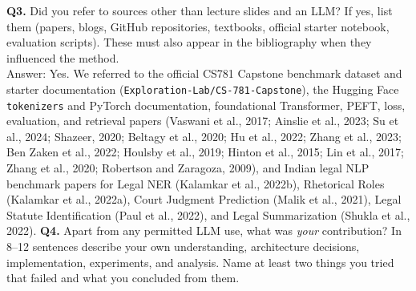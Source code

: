 \documentclass[11pt, oneside]{article}
\begin{document}
\medskip
\noindent
\textbf{Q3.} Did you refer to sources other than lecture slides and an LLM?
If yes, list them (papers, blogs, GitHub repositories, textbooks, official starter notebook, evaluation scripts). These must also appear in the bibliography when they influenced the method. \\[0.3em]
Answer: Yes. We referred to the official CS781 Capstone benchmark dataset and starter documentation (\texttt{Exploration-Lab/CS-781-Capstone}), the Hugging Face \texttt{tokenizers} and PyTorch documentation, foundational Transformer, PEFT, loss, evaluation, and retrieval papers (Vaswani et al., 2017; Ainslie et al., 2023; Su et al., 2024; Shazeer, 2020; Beltagy et al., 2020; Hu et al., 2022; Zhang et al., 2023; Ben Zaken et al., 2022; Houlsby et al., 2019; Hinton et al., 2015; Lin et al., 2017; Zhang et al., 2020; Robertson and Zaragoza, 2009), and Indian legal NLP benchmark papers for Legal NER (Kalamkar et al., 2022b), Rhetorical Roles (Kalamkar et al., 2022a), Court Judgment Prediction (Malik et al., 2021), Legal Statute Identification (Paul et al., 2022), and Legal Summarization (Shukla et al., 2022).
\medskip
\noindent
\textbf{Q4.} Apart from any permitted LLM use, what was \emph{your} contribution? In 8--12 sentences describe your own understanding, architecture decisions, implementation, experiments, and analysis. Name at least two things you tried that failed and what you concluded from them. \\[0.3em]
\end{document}
